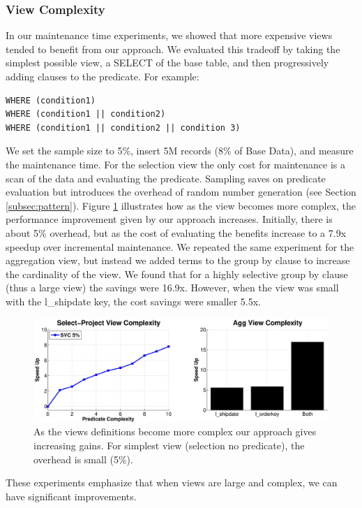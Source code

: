 \subsubsection{View Complexity}
In our maintenance time experiments, we showed that more expensive views tended to benefit from our approach.
We evaluated this tradeoff by taking the simplest possible view, a SELECT of the base table, and then progressively adding clauses to the predicate.
For example:
\begin{lstlisting}
WHERE (condition1)
WHERE (condition1 || condition2)
WHERE (condition1 || condition2 || condition 3)
\end{lstlisting}
We set the sample size to 5\%, insert 5M records (8\% of Base Data), and measure the maintenance time.
For the selection view the only cost for maintenance is a scan of the data and evaluating the predicate. 
Sampling saves on predicate evaluation but introduces the overhead of random number generation (see Section \ref{subsec:pattern}). 
Figure \ref{exp11overheads} illustrates how as the view becomes more complex, the performance improvement given
by our approach increases.
Initially, there is about 5\% overhead, but as the cost of evaluating the benefits increase to a 7.9x speedup over incremental maintenance.
We repeated the same experiment for the aggregation view, but instead we added terms to the group by clause to increase the
cardinality of the view.
We found that for a highly selective group by clause (thus a large view) the savings were 16.9x.
However, when the view was small with the l\_shipdate key, the cost savings were smaller 5.5x.
\begin{figure}[h]
\hspace{-3.5em}
 \includegraphics[scale=0.21]{exp/complexity_efficiency_tradeoff.eps}
 \caption{As the views definitions become more complex our approach gives increasing gains. For simplest view (selection no predicate), the overhead is small (5\%).\label{exp11overheads}}
\end{figure}
These experiments emphasize that when views are large and complex, we can have significant improvements.

